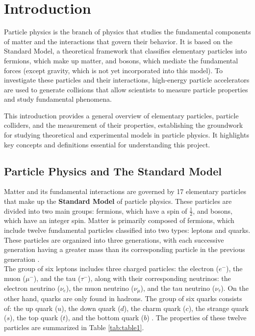 \chapter{Introduction}
\label{ch1}

Particle physics is the branch of physics that studies the fundamental components of matter and the interactions that govern their behavior. It is based on the Standard Model, a theoretical framework that classifies elementary particles into fermions, which make up matter, and bosons, which mediate the fundamental forces (except gravity, which is not yet incorporated into this model). To investigate these particles and their interactions, high-energy particle accelerators are used to generate collisions that allow scientists to measure particle properties and study fundamental phenomena.

This introduction provides a general overview of elementary particles, particle colliders, and the measurement of their properties, establishing the groundwork for studying theoretical and experimental models in particle physics. It highlights key concepts and definitions essential for understanding this project.

\section{Particle Physics and The Standard Model}


Matter and its fundamental interactions are governed by 17 elementary particles that make up the \textbf{Standard Model} of particle physics. These particles are divided into two main groups: fermions, which have a spin of \( \frac{1}{2} \), and bosons, which have an integer spin. Matter is primarily composed of fermions, which include twelve fundamental particles classified into two types: leptons and quarks. These particles are organized into three generations, with each successive generation having a greater mass than its corresponding particle in the previous generation \cite{thomson_2013}.\\

The group of six leptons includes three charged particles: the electron (\(e^-\)), the muon (\(\mu^-\)), and the tau (\(\tau^-\)), along with their corresponding neutrinos: the electron neutrino (\(\nu_e\)), the muon neutrino (\(\nu_\mu\)), and the tau neutrino (\(\nu_\tau\)). On the other hand, quarks are only found in hadrons. The group of six quarks consists of: the up quark (\(u\)), the down quark (\(d\)), the charm quark (\(c\)), the strange quark (\(s\)), the top quark (\(t\)), and the bottom quark (\(b\)) \cite{griff,thomson_2013}. The properties of these twelve particles are summarized in Table \ref{tab:table1}.


